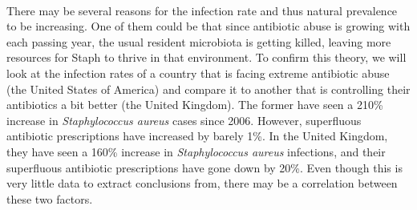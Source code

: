 \paragraph{}There may be several reasons for the infection rate and thus natural prevalence to be increasing. One of them could be that since antibiotic abuse is growing with each passing year, the usual resident microbiota is getting killed, leaving more resources for Staph to thrive in that environment. To confirm this theory, we will look at the infection rates of a country that is facing extreme antibiotic abuse (the United States of America) and compare it to another that is controlling their antibiotics a bit better (the United Kingdom). The former have seen a 210\% increase in \emph{Staphylococcus aureus} cases since 2006. However, superfluous antibiotic prescriptions have increased by barely 1\%\cite{baggsEstimatingNationalTrends2016}. In the United Kingdom, they have seen a 160\% increase in \emph{Staphylococcus aureus} infections\cite{englandMSSABacteraemiaAnnual2021}, and their superfluous antibiotic prescriptions have gone down by 20\%. Even though this is very little data to extract conclusions from, there may be a correlation between these two factors.

